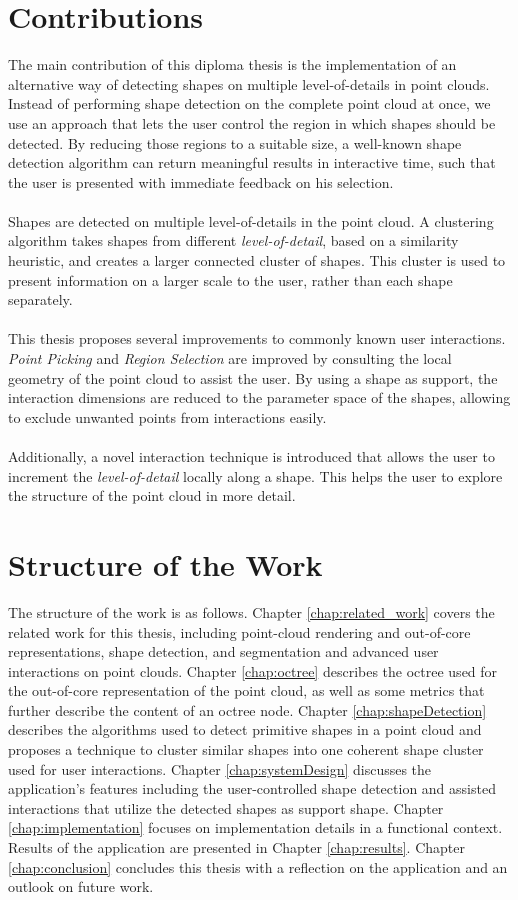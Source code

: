\section{Contributions}

The main contribution of this diploma thesis is the implementation of an alternative way of detecting shapes on multiple level-of-details in point clouds. Instead of performing shape detection on the complete point cloud at once, we use an approach that lets the user control the region in which shapes should be detected. By reducing those regions to a suitable size, a well-known shape detection algorithm can return meaningful results in interactive time, such that the user is presented with immediate feedback on his selection. 
\\
\\
Shapes are detected on multiple level-of-details in the point cloud. A clustering algorithm takes shapes from different \textit{level-of-detail}, based on a similarity heuristic, and creates a larger connected cluster of shapes. This cluster is used to present information on a larger scale to the user, rather than each shape separately. 
\\
\\ 
This thesis proposes several improvements to commonly known user interactions. \textit{Point Picking} and \textit{Region Selection} are improved by consulting the local geometry of the point cloud to assist the user. By using a shape as support, the interaction dimensions are reduced to the parameter space of the shapes, allowing to exclude unwanted points from interactions easily. 
\\
\\
Additionally,  a novel interaction technique is introduced that allows the user to increment the \textit{level-of-detail} locally along a shape. This helps the user to explore the structure of the point cloud in more detail. 


\section{Structure of the Work}

The structure of the work is as follows. Chapter \ref{chap:related_work} covers the related work for this thesis, including point-cloud rendering and out-of-core representations, shape detection, and segmentation and advanced user interactions on point clouds. Chapter \ref{chap:octree} describes the octree used for the out-of-core representation of the point cloud, as well as some metrics that further describe the content of an octree node. Chapter \ref{chap:shapeDetection} describes the algorithms used to detect primitive shapes in a point cloud and proposes a technique to cluster similar shapes into one coherent shape cluster used for user interactions. Chapter \ref{chap:systemDesign} discusses the application's features including the user-controlled shape detection and assisted interactions that utilize the detected shapes as support shape. Chapter \ref{chap:implementation} focuses on implementation details in a functional context. Results of the application are presented in Chapter \ref{chap:results}. Chapter \ref{chap:conclusion} concludes this thesis with a reflection on the application and an outlook on future work. 
